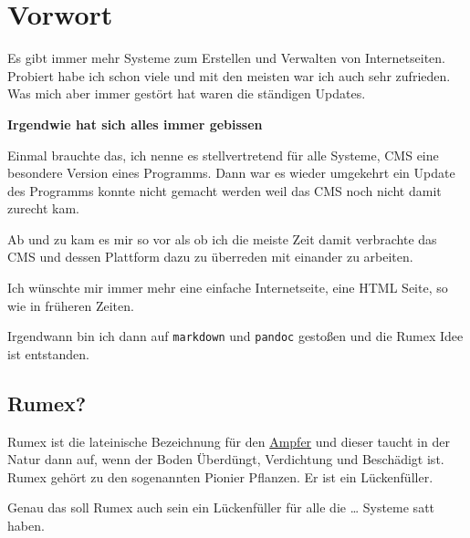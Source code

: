 \chapter{Vorwort}
\label{kap:vorwort}

Es gibt immer mehr Systeme zum Erstellen und Verwalten von
Internetseiten.
Probiert habe ich schon viele und mit den meisten war ich 
auch sehr zufrieden.
Was mich aber immer gestört hat waren die ständigen Updates.

\textbf{Irgendwie hat sich alles immer gebissen}

Einmal brauchte das, ich nenne es stellvertretend 
für alle Systeme, CMS eine besondere
Version eines Programms.
Dann war es wieder umgekehrt ein Update des Programms 
konnte nicht gemacht werden weil das CMS noch nicht damit 
zurecht kam.

Ab und zu kam es mir so vor als ob ich die meiste Zeit
damit verbrachte das CMS und dessen Plattform dazu zu überreden
mit einander zu arbeiten.

Ich wünschte mir immer mehr eine einfache Internetseite,
eine HTML Seite, so wie in früheren Zeiten. 

Irgendwann bin ich dann auf \texttt{markdown} und \texttt{pandoc}
gestoßen und die Rumex Idee ist entstanden.


\section{Rumex?}
\label{sec:rumex}

Rumex ist die lateinische Bezeichnung für den
\href{http://de.wikipedia.org/wiki/Ampfer}{Ampfer} und dieser taucht in
der Natur dann auf, wenn der Boden Überdüngt, Verdichtung und Beschädigt
ist. Rumex gehört zu den sogenannten Pionier Pflanzen. Er ist ein
Lückenfüller.

Genau das soll Rumex auch sein \flqq{}ein Lückenfüller\frqq{} für alle die
\ldots{} Systeme satt haben.




